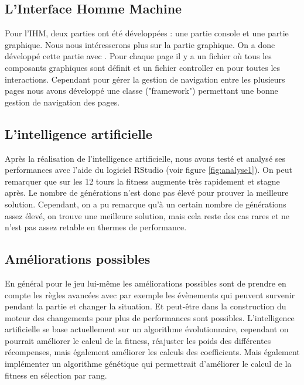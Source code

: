\subsection{L'Interface Homme Machine}
Pour l'IHM, deux parties ont été développées : une partie console et une partie graphique.
Nous nous intéresserons plus sur la partie graphique. On a donc développé cette partie avec \fx. Pour chaque page il y a un fichier \fxml où tous les composants graphiques sont définit et un fichier controller en \java pour toutes les interactions. Cependant pour gérer la gestion de navigation entre les plusieurs pages nous avons développé une classe ("framework") permettant une bonne gestion de navigation des pages.
\subsection{L'intelligence artificielle }
Après la réalisation de l'intelligence artificielle, nous avons testé et analysé ses performances avec l'aide du logiciel RStudio (voir figure \ref{fig:analyse1}). On peut remarquer que sur les 12 tours la fitness augmente très rapidement et stagne après. Le nombre de générations n'est donc pas élevé pour prouver la meilleure solution. Cependant, on a pu remarque qu'à un certain nombre de générations assez élevé, on trouve une meilleure solution, mais cela reste des cas rares et ne n'est pas assez retable en thermes de performance.

\subsection{Améliorations possibles}
En général pour le jeu lui-même les améliorations possibles sont de prendre en compte les règles avancées avec par exemple les évènements qui peuvent survenir pendant la partie et changer la situation. Et peut-être dans la construction du moteur des changements pour plus de performances sont possibles.
L'intelligence artificielle se base actuellement sur un algorithme évolutionnaire, cependant on pourrait améliorer le calcul de la fitness, réajuster les poids des différentes récompenses, mais également améliorer les calculs des coefficients. Mais également implémenter un algorithme génétique qui permettrait d'améliorer le calcul de la fitness en sélection par rang.